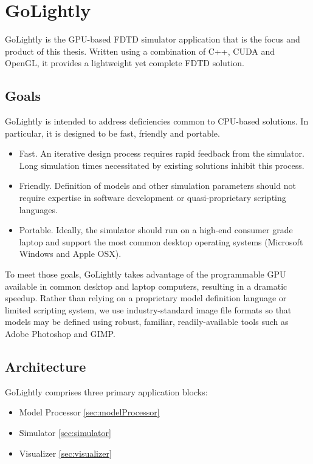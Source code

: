 \chapter{GoLightly} \label{ch:golightly}

GoLightly is the GPU-based FDTD simulator application that is the focus and product of this thesis. Written using a combination of C++, CUDA and OpenGL, it provides a lightweight yet complete FDTD solution.

\section{Goals}

GoLightly is intended to address deficiencies common to CPU-based solutions. In particular, it is designed to be fast, friendly and portable.


\begin{itemize}
	\item Fast. An iterative design process requires rapid feedback from the simulator. Long simulation times necessitated by existing solutions inhibit this process.
	\item Friendly. Definition of models and other simulation parameters should not require expertise in software development or quasi-proprietary scripting languages. 
	\item Portable. Ideally, the simulator should run on a high-end consumer grade laptop and support the most common desktop operating systems (Microsoft Windows and Apple OSX).  
\end{itemize}

To meet those goals, GoLightly takes advantage of the programmable GPU available in common desktop and laptop computers, resulting in a dramatic speedup. Rather than relying on a proprietary model definition language or limited scripting system, we use industry-standard image file formats so that models may be defined using robust, familiar, readily-available tools such as Adobe Photoshop and GIMP.

\section{Architecture}

GoLightly comprises three primary application blocks:

\begin{itemize}
	\item Model Processor \ref{sec:modelProcessor}
	\item Simulator \ref{sec:simulator}
	\item Visualizer \ref{sec:visualizer}
\end{itemize}

